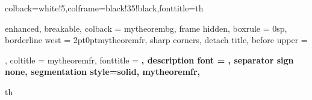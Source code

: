 \usepackage{tikzsymbols}
\renewcommand\qedsymbol{$\Laughey$}

\newcommand*\Heq{\ensuremath{\overset{\kern2pt H}{=}}}

\renewcommand{\mathsection}[2]{
  	\pagebreak \bigbreak \noindent
  	\begin{Large}
      	\begin{mdframed}
          	\begin{center}
              	\textbf{#1}
          	\end{center}
      	\end{mdframed}
  	\end{Large}
  	\begin{Large}
      	\begin{center}
          	\textbf{#2}
      	\end{center}
  	\end{Large}
  	\line(1,0){490}
}

%
{colback=white!5,colframe=black!35!black,fonttitle=\bfseries}{th}

\usepackage{import}
\usepackage{xifthen}
\usepackage{pdfpages}
\usepackage{transparent}








\setlength{\parindent}{1cm}

{%
	enhanced,
	breakable,
	colback = mytheorembg,
	frame hidden,
	boxrule = 0sp,
	borderline west = {2pt}{0pt}{mytheoremfr},
	sharp corners,
	detach title,
	before upper = \tcbtitle\par\smallskip,
	coltitle = mytheoremfr,
	fonttitle = \bfseries\sffamily,
	description font = \mdseries,
	separator sign none,
	segmentation style={solid, mytheoremfr},
}
{th}

